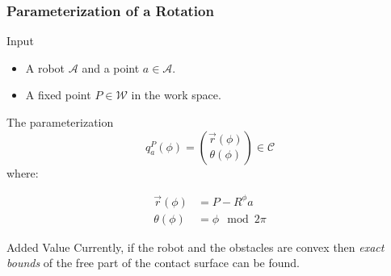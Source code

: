 \documentclass[ucs,9pt,pagenumbers]{beamer}
\begin{document}
\begin{frame}
  \frametitle{Parameterization of a Rotation}
  \begin{block}{Input}
    \begin{itemize}
    \item A robot \(\mathcal{A}\) and a point \(a\in\mathcal{A}\).
    \item A fixed point \(P \in \mathcal{W}\) in the work space.
    \end{itemize}
  \end{block}

  \begin{minipage}{0.45\linewidth}
    \begin{block}{The parameterization}
      \[
      q^P_a(\phi) = \binom{\vec{r}(\phi)}{\theta(\phi)} \in
      \mathcal{C}
      \]
      where:

    \begin{align*}
      \vec{r}(\phi) & =  P- R^{\phi} a\\
      \theta(\phi) & = \phi \mod 2\pi
    \end{align*}
  \end{block}
\end{minipage}
\hfill
\begin{minipage}{0.45\linewidth}
  \begin{block}{Added Value}
    Currently, if the robot and the obstacles are convex then \emph{exact
    bounds} of the free part of the contact surface can be found.
  \end{block}
\end{minipage}
\end{frame}
\end{document}

